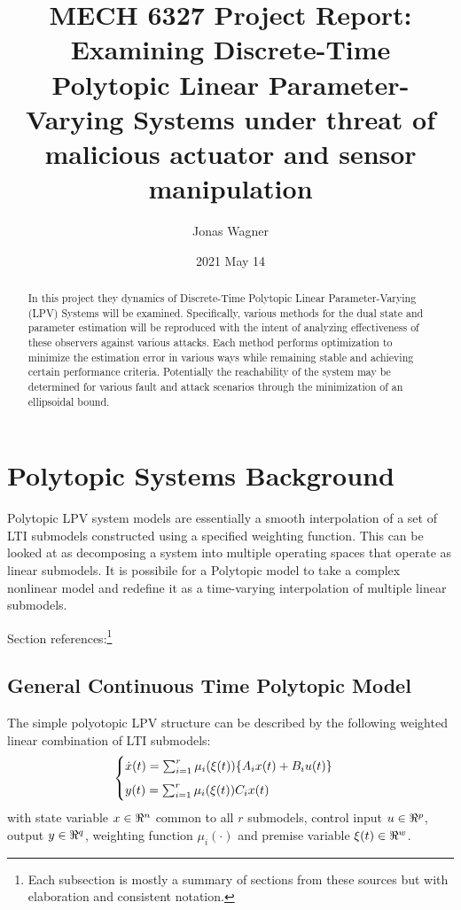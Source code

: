 \documentclass[]{article}
\title{MECH 6327 Project Report:\\
Examining Discrete-Time Polytopic Linear Parameter-Varying Systems under threat of malicious actuator and sensor manipulation}
\author{Jonas Wagner}
\date{2021 May 14}
\begin{document}
\maketitle

\begin{abstract}
	In this project they dynamics of Discrete-Time Polytopic Linear Parameter-Varying (LPV) Systems will be examined. Specifically, various methods for the dual state and parameter estimation will be reproduced with the intent of analyzing effectiveness of these observers against various attacks. Each method performs optimization to minimize the estimation error in various ways while remaining stable and achieving certain performance criteria. Potentially the reachability of the system may be determined for various fault and attack scenarios through the minimization of an ellipsoidal bound.
\end{abstract}


\newpage
\tableofcontents


\newpage
\section{Polytopic Systems Background}
Polytopic LPV system models are essentially a smooth interpolation of a set of LTI submodels constructed using a specified weighting function. This can be looked at as decomposing a system into multiple operating spaces that operate as linear submodels. It is possibile for a Polytopic model to take a complex nonlinear model and redefine it as a time-varying interpolation of multiple linear submodels.

Section references:\footnote{Each subsection is mostly a summary of sections from these sources but with elaboration and consistent notation.}
\cite{beelen2017joint} \cite{ORJUELA2019295} \cite{orjuela2013nonlinear}\\

\subsection{General Continuous Time Polytopic Model} 
The simple polyotopic LPV structure can be described by the following weighted linear combination of LTI submodels:
\begin{equation}\label{eq:CT_poly_sys_def}
	\begin{cases}
		\dot{x}(t) 	= \sum_{i=1}^r \mu_i(\xi(t))\{A_i x(t) + B_i u(t)\}  \vspace{5pt} \\ 
		y(t)		= \sum_{i=1}^r \mu_i(\xi(t)) C_i x(t)
	\end{cases}
\end{equation}
with state variable $x \in \real^n$ common to all $r$ submodels, control input $u \in \real^p$, output $y \in \real^q$, weighting function $\mu_i(\cdot)$ and premise variable $\xi(t) \in \real^{w}$. 
\end{document}
